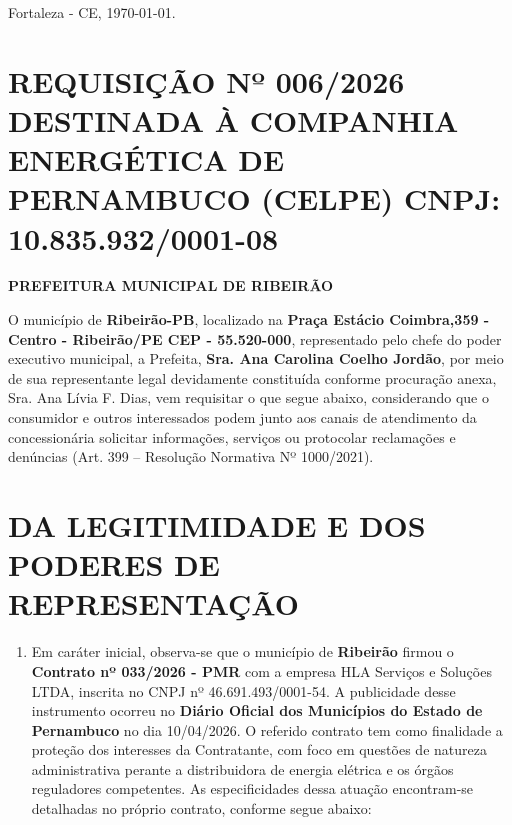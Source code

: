 \documentclass[11pt,a4paper]{article}
\begin{document}
\begin{flushright}
Fortaleza - CE, \today.
\end{flushright}

\section{REQUISIÇÃO Nº 006/2026 DESTINADA À COMPANHIA ENERGÉTICA DE PERNAMBUCO (CELPE) CNPJ: 10.835.932/0001-08}
\vspace{-0.4cm}
\textbf{PREFEITURA MUNICIPAL DE RIBEIRÃO}

\vspace{0.5cm}

O município de \textbf{Ribeirão-PB}, localizado na \textbf{Praça Estácio Coimbra,359 - Centro - Ribeirão/PE CEP - 55.520-000}, representado pelo chefe do poder executivo municipal, a Prefeita, \textbf{Sra. Ana Carolina Coelho Jordão}, por meio de sua representante legal devidamente constituída conforme procuração anexa, Sra. Ana Lívia F. Dias, vem requisitar o que segue abaixo, considerando que o consumidor e outros interessados podem junto aos canais de atendimento da concessionária solicitar informações, serviços ou protocolar reclamações e denúncias (Art. 399 -- Resolução Normativa Nº 1000/2021).

\section{DA LEGITIMIDADE E DOS PODERES DE REPRESENTAÇÃO}

\begin{enumerate}
\item
  Em caráter inicial, observa-se que o município de \textbf{Ribeirão} firmou o \textbf{Contrato nº 033/2026 - PMR} com a empresa HLA Serviços e Soluções LTDA, inscrita no CNPJ nº 46.691.493/0001-54. A publicidade desse instrumento ocorreu no \textbf{Diário Oficial dos Municípios do Estado de Pernambuco} no dia 10/04/2026. O referido contrato tem como finalidade a proteção dos interesses da Contratante, com foco em questões de natureza administrativa perante a distribuidora de energia elétrica e os órgãos reguladores competentes. As especificidades dessa atuação encontram-se detalhadas no próprio contrato, conforme segue abaixo:
\end{enumerate}
\end{document}
